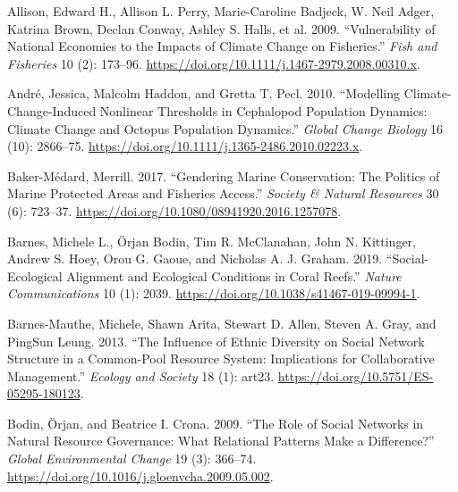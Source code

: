 \documentclass[
]{article}
\newlength{\cslhangindent}
\newlength{\cslentryspacingunit} %
\newenvironment{CSLReferences}[2] %
 {%
  \setlength{\parindent}{0pt}
  \ifodd #1
  \let\oldpar\par
  \def\par{\hangindent=\cslhangindent\oldpar}
  \fi
  \setlength{\parskip}{#2\cslentryspacingunit}
 }%
 {}
\begin{document}
\hypertarget{refs}{}
\begin{CSLReferences}{1}{0}
\leavevmode{}%
Allison, Edward H., Allison L. Perry, Marie-Caroline Badjeck, W. Neil Adger, Katrina Brown, Declan Conway, Ashley S. Halls, et al. 2009. {``Vulnerability of National Economies to the Impacts of Climate Change on Fisheries.''} \emph{Fish and Fisheries} 10 (2): 173--96. \url{https://doi.org/10.1111/j.1467-2979.2008.00310.x}.

\leavevmode{}%
André, Jessica, Malcolm Haddon, and Gretta T. Pecl. 2010. {``Modelling Climate-Change-Induced Nonlinear Thresholds in Cephalopod Population Dynamics: {Climate} Change and Octopus Population Dynamics.''} \emph{Global Change Biology} 16 (10): 2866--75. \url{https://doi.org/10.1111/j.1365-2486.2010.02223.x}.

\leavevmode{}%
Baker-Médard, Merrill. 2017. {``Gendering {Marine} {Conservation}: {The} {Politics} of {Marine} {Protected} {Areas} and {Fisheries} {Access}.''} \emph{Society \& Natural Resources} 30 (6): 723--37. \url{https://doi.org/10.1080/08941920.2016.1257078}.

\leavevmode{}%
Barnes, Michele L., Örjan Bodin, Tim R. McClanahan, John N. Kittinger, Andrew S. Hoey, Orou G. Gaoue, and Nicholas A. J. Graham. 2019. {``Social-Ecological Alignment and Ecological Conditions in Coral Reefs.''} \emph{Nature Communications} 10 (1): 2039. \url{https://doi.org/10.1038/s41467-019-09994-1}.

\leavevmode{}%
Barnes-Mauthe, Michele, Shawn Arita, Stewart D. Allen, Steven A. Gray, and PingSun Leung. 2013. {``The {Influence} of {Ethnic} {Diversity} on {Social} {Network} {Structure} in a {Common}-{Pool} {Resource} {System}: {Implications} for {Collaborative} {Management}.''} \emph{Ecology and Society} 18 (1): art23. \url{https://doi.org/10.5751/ES-05295-180123}.

\leavevmode{}%
Bodin, Örjan, and Beatrice I. Crona. 2009. {``The Role of Social Networks in Natural Resource Governance: {What} Relational Patterns Make a Difference?''} \emph{Global Environmental Change} 19 (3): 366--74. \url{https://doi.org/10.1016/j.gloenvcha.2009.05.002}.


\end{CSLReferences}
\end{document}

